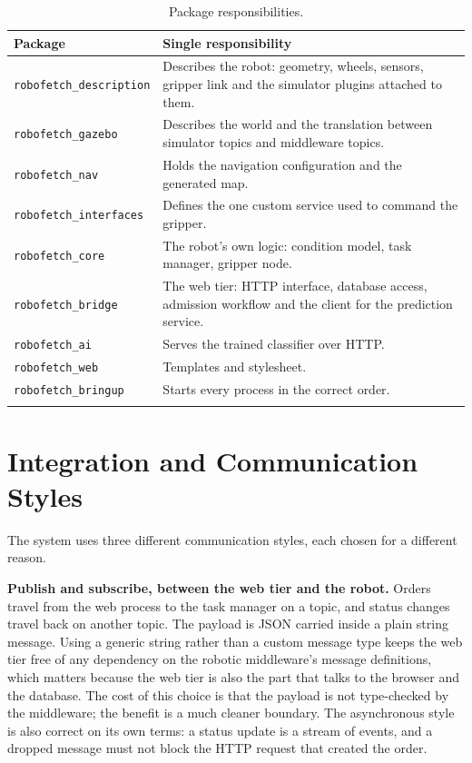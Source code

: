 \documentclass[12pt,a4paper]{report}
\newcommand{\code}[1]{\texttt{#1}}
\begin{document}
\begin{longtable}{@{}p{}p{}@{}}
\toprule
\textbf{Package} & \textbf{Single responsibility} \\
\midrule
\endhead
\code{robofetch\_description} & Describes the robot: geometry, wheels, sensors, gripper link and
the simulator plugins attached to them. \\
\code{robofetch\_gazebo} & Describes the world and the translation between simulator topics and
middleware topics. \\
\code{robofetch\_nav} & Holds the navigation configuration and the generated map. \\
\code{robofetch\_interfaces} & Defines the one custom service used to command the gripper. \\
\code{robofetch\_core} & The robot's own logic: condition model, task manager, gripper node. \\
\code{robofetch\_bridge} & The web tier: HTTP interface, database access, admission workflow and
the client for the prediction service. \\
\code{robofetch\_ai} & Serves the trained classifier over HTTP. \\
\code{robofetch\_web} & Templates and stylesheet. \\
\code{robofetch\_bringup} & Starts every process in the correct order. \\
\bottomrule
\caption{Package responsibilities.}
\label{tab:components}
\end{longtable}

\section{Integration and Communication Styles}
The system uses three different communication styles, each chosen for a different reason.

\textbf{Publish and subscribe, between the web tier and the robot.} Orders travel from the web
process to the task manager on a topic, and status changes travel back on another topic. The
payload is JSON carried inside a plain string message. Using a generic string rather than a custom
message type keeps the web tier free of any dependency on the robotic middleware's message
definitions, which matters because the web tier is also the part that talks to the browser and the
database. The cost of this choice is that the payload is not type-checked by the middleware; the
benefit is a much cleaner boundary. The asynchronous style is also correct on its own terms: a
status update is a stream of events, and a dropped message must not block the HTTP request that
created the order.
\end{document}
